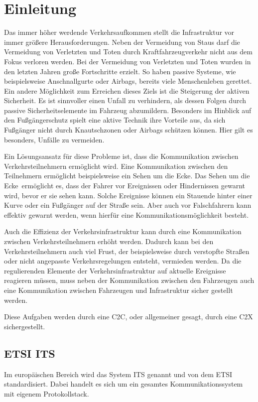 \chapter{Einleitung \label{chap_einleitung}}
Das immer höher werdende Verkehrsaufkommen stellt die Infrastruktur vor immer größere Herausforderungen. Neben der Vermeidung von Staus darf die Vermeidung von Verletzten und Toten durch Kraftfahrzeugverkehr nicht aus dem Fokus verloren werden. Bei der Vermeidung von Verletzten und Toten wurden in den letzten Jahren große Fortschritte erzielt. So haben passive Systeme, wie beispielsweise Anschnallgurte oder Airbags, bereits viele Menschenleben gerettet. Ein andere Möglichkeit zum Erreichen dieses Ziels ist die Steigerung der aktiven Sicherheit. Es ist sinnvoller einen Unfall zu verhindern, als dessen Folgen durch passive Sicherheitselemente im Fahrzeug abzumildern. Besonders im Hinblick auf den Fußgängerschutz spielt eine aktive Technik ihre Vorteile aus, da sich Fußgänger nicht durch Knautschzonen oder Airbags schützen können. Hier gilt es besonders, Unfälle zu vermeiden.

Ein Lösungsansatz für diese Probleme ist, dass die Kommunikation zwischen Verkehrsteilnehmern ermöglicht wird. Eine Kommunikation zwischen den Teilnehmern ermöglicht beispielsweise ein \glqq Sehen um die Ecke\grqq. Das \glqq Sehen um die Ecke\grqq~ermöglicht es, dass der Fahrer vor Ereignissen oder Hindernissen gewarnt wird, bevor er sie sehen kann. Solche Ereignisse können ein Stauende hinter einer Kurve oder ein Fußgänger auf der Straße sein. Aber auch vor Falschfahrern kann effektiv gewarnt werden, wenn hierfür eine Kommunikationsmöglichkeit besteht.

Auch die Effizienz der Verkehrsinfrastruktur kann durch eine Kommunikation zwischen Verkehrsteilnehmern erhöht werden. Dadurch kann bei den Verkehrsteilnehmern auch viel Frust, der beispielsweise durch verstopfte Straßen oder nicht angepasste Verkehrsregelungen entsteht, vermieden werden. Da die regulierenden Elemente der Verkehrsinfrastruktur auf aktuelle Ereignisse reagieren müssen, muss neben der Kommunikation zwischen den Fahrzeugen auch eine Kommunikation zwischen Fahrzeugen und Infrastruktur sicher gestellt werden.

Diese Aufgaben werden durch eine \ac{C2C}, oder allgemeiner gesagt, durch eine \ac{C2X} sichergestellt. 

\section{ETSI ITS}
Im europäischen Bereich wird das System \ac{ITS} genannt und von dem \ac{ETSI} standardisiert. Dabei handelt es sich um ein gesamtes Kommunikationssystem mit eigenem Protokollstack. 

